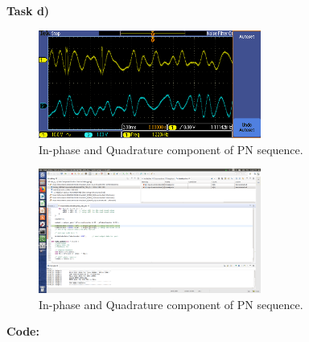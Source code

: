 \documentclass{article}
\begin{document}
\pagebreak
\textbf{Task d)}

\begin{figure}[h]
  \begin{center}
    \includegraphics[width=0.65\textwidth]{img/task_d_oscilloscope.png}
    \caption{In-phase and Quadrature component of PN sequence.}
  \end{center}
\end{figure}

\begin{figure}[h]
  \begin{center}
    \includegraphics[width=0.65\textwidth]{img/task_d_profile.png}
    \caption{In-phase and Quadrature component of PN sequence.}
  \end{center}
\end{figure}

\pagebreak
\textbf{Code:}
\end{document}
